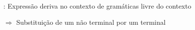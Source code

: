 \begin{simbolos}
  \item[:] Expressão deriva no contexto de gramáticas livre do contexto 
  \item[$\Rightarrow$] Substituição de um não terminal por um terminal
\end{simbolos}
